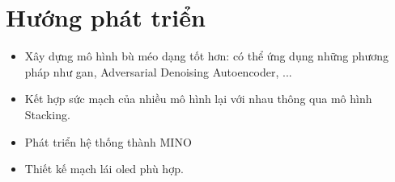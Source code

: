 \section{Hướng phát triển}
\begin{itemize}
\item Xây dựng mô hình bù méo dạng tốt hơn: có thể ứng dụng những phương pháp như \ac{gan}, Adversarial Denoising Autoencoder, ...
\item Kết hợp sức mạch của nhiều mô hình lại với nhau thông qua mô hình Stacking. 
\item Phát triển hệ thống thành MINO
\item Thiết kế mạch lái \ac{oled} phù hợp.
\end{itemize}